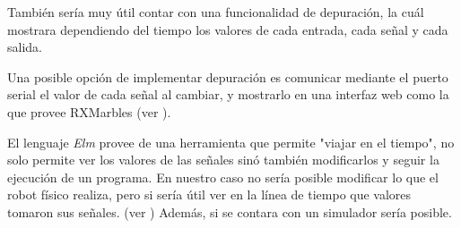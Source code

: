   También sería muy útil contar con una funcionalidad de depuración, la cuál
mostrara dependiendo del tiempo los valores de cada entrada, cada señal y cada
salida.

  Una posible opción de implementar depuración es comunicar
mediante el puerto serial el valor de cada señal al cambiar,
y mostrarlo en una interfaz web como la que provee
RXMarbles (ver \cite{rxmarbles}). 

  El lenguaje \textit{Elm} provee de una herramienta que permite "viajar en el 
tiempo", no solo permite ver los valores de las señales sinó también
modificarlos y seguir la ejecución de un programa.
  En nuestro caso no sería posible modificar lo que el robot físico
realiza, pero si sería útil ver en la línea de tiempo que valores
tomaron sus señales. (ver \cite{elmdebug}) Además, si se contara
con un simulador sería posible.



